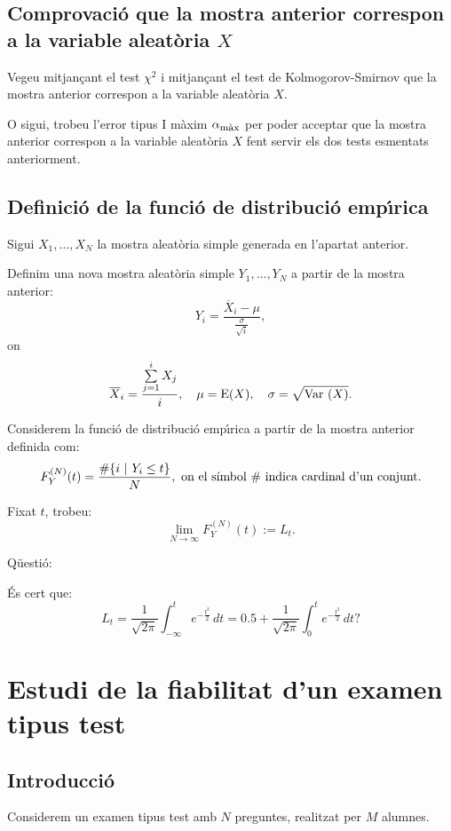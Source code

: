 \subsection{Comprovaci\'o que la mostra anterior correspon a la 
va\-ria\-ble aleat\`oria $X$}

Vegeu mitjan\c{c}ant el test $\chi^2$ i mitjan\c{c}ant el test
de Kolmogorov-Smirnov que la mostra anterior 
correspon a la variable aleat\`oria $X$.

O sigui, trobeu l'error tipus I m\`axim 
$\alpha_{\mbox{\footnotesize m\`ax}}$ per 
poder acceptar que la mostra anterior correspon a la
variable aleat\`oria $X$ fent servir els dos tests esmentats anteriorment.

\subsection{Definici\'o de la funci\'o de distribuci\'o
emp\'{\i}rica}

Sigui $X_1,\ldots,X_N$ la mostra aleat\`oria
 simple generada en
l'apartat anterior.

Definim una nova mostra aleat\`oria
 simple $Y_1,\ldots,Y_N$ a 
partir de la mostra anterior:
\[
Y_i = \frac{\overline{X}_i -\mu}{\frac{\sigma}{\sqrt{i}}}, 
\]
on
\[
\overline{X}_i =  \frac{\sum\limits_{j=1}^i X_j}{i},\quad 
\mu =  {\rm E} (X), \quad
\sigma =  \sqrt{\mbox{Var }(X)}.
\]

Considerem la funci\'o de distribuci\'o
 emp\'{\i}rica 
a partir de la mostra anterior definida com:
\[
F_{Y}^{(N)}(t) = \frac{\#\{i\ |\ Y_i\leq t\}}{N}, \mbox{ on el 
s\'{\i}mbol $\#$ indica cardinal d'un conjunt.}
\]

Fixat $t$, trobeu:
\[  
\lim_{N\to\infty} F_{Y}^{(N)}(t) := L_t.
\]

Q\"uesti\'o:

\'Es cert que:
\[
L_t = \frac{1}{\sqrt{2\pi}}\int_{-\infty}^t e^{-\frac{t^2}{2}}\, dt =
0.5+\frac{1}{\sqrt{2\pi}}\int_{0}^t e^{-\frac{t^2}{2}}\, dt?
\]
\section{Estudi de la fiabilitat d'un examen tipus test}

\subsection{Introducci\'o}

Considerem un examen tipus test amb $N$ preguntes, realitzat per 
$M$ alumnes.

